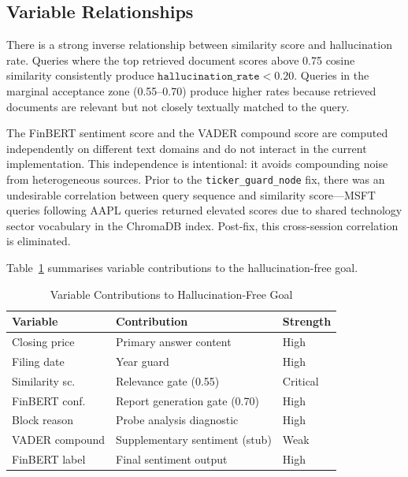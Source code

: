 \documentclass[10pt,journal,compsoc]{IEEEtran}
\newcommand{\node}[1]{\texttt{#1}}
\begin{document}
\subsection{Variable Relationships}

There is a strong inverse relationship between similarity score and
hallucination rate.
Queries where the top retrieved document scores above 0.75 cosine
similarity consistently produce $\texttt{hallucination\_rate} < 0.20$.
Queries in the marginal acceptance zone (0.55--0.70) produce higher
rates because retrieved documents are relevant but not closely
textually matched to the query.

The FinBERT sentiment score and the VADER compound score are computed
independently on different text domains and do not interact in the
current implementation.
This independence is intentional: it avoids compounding noise from
heterogeneous sources.
Prior to the \node{ticker\_guard\_node} fix, there was an undesirable
correlation between query sequence and similarity score---MSFT queries
following AAPL queries returned elevated scores due to shared
technology sector vocabulary in the ChromaDB index.
Post-fix, this cross-session correlation is eliminated.

Table~\ref{tab:contributions} summarises variable contributions to
the hallucination-free goal.

\begin{table}[htbp]
\caption{Variable Contributions to Hallucination-Free Goal}
\label{tab:contributions}
\centering
\small
\begin{tabular}{@{}lll@{}}
\toprule
\textbf{Variable} & \textbf{Contribution} & \textbf{Strength} \\
\midrule
Closing price  & Primary answer content         & High \\
Filing date    & Year guard                     & High \\
Similarity sc. & Relevance gate (0.55)          & Critical \\
FinBERT conf.  & Report generation gate (0.70)  & High \\
Block reason   & Probe analysis diagnostic      & High \\
VADER compound & Supplementary sentiment (stub) & Weak \\
FinBERT label  & Final sentiment output         & High \\
\bottomrule
\end{tabular}
\end{table}
\end{document}
